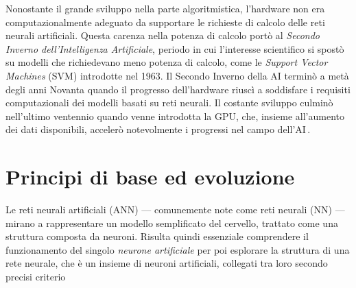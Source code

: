 Nonostante il grande sviluppo nella parte algoritmistica, l'hardware non era computazionalmente adeguato da supportare le richieste di calcolo delle reti neurali artificiali. Questa carenza nella potenza di calcolo portò al \textsl{Secondo Inverno dell'Intelligenza Artificiale}, periodo in cui l'interesse scientifico si spostò su modelli che richiedevano meno potenza di calcolo, come le \textit{Support Vector Machines} (\acs{SVM}) introdotte nel 1963. Il Secondo Inverno della \acs{AI} terminò a metà degli anni Novanta quando il progresso dell'hardware riuscì a soddisfare i requisiti computazionali dei modelli basati su reti neurali. Il costante sviluppo culminò nell'ultimo ventennio quando venne introdotta la \acs{GPU}, che, insieme all'aumento dei dati disponibili, accelerò notevolmente i progressi nel campo dell'\acs{AI}\,\cite{flasinski2016introduction, muthukrishnan2020brief}.

\section{Principi di base ed evoluzione}
%
Le reti neurali artificiali (\acs{ANN}) — comunemente note come reti neurali (\acs{NN}) — mirano a rappresentare un modello semplificato del cervello, trattato come una struttura composta da neuroni. Risulta quindi essenziale comprendere il funzionamento del singolo \textsl{neurone artificiale} per poi esplorare la struttura di una rete neurale, che è un insieme di neuroni artificiali, collegati tra loro secondo precisi criterio

